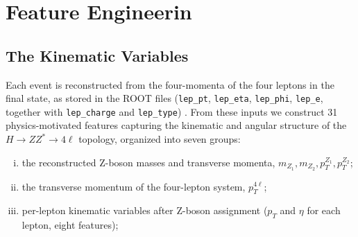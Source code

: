 \documentclass[conference]{IEEEtran}
\begin{document}
{\begin{table}[htbp]
\centering
\small
\caption{Signal and background yields}
\label{tab:yield_preselection}

\end{table}

\section{Feature Engineerin}
\subsection{The Kinematic Variables}

Each event is reconstructed from the four-momenta of the four leptons in the final state, as stored in the ROOT files (\texttt{lep\_pt}, \texttt{lep\_eta}, \texttt{lep\_phi}, \texttt{lep\_e}, together with \texttt{lep\_charge} and \texttt{lep\_type}) \cite{CMS2025Higgs4l}. From these inputs we construct 31 physics-motivated features capturing the kinematic and angular structure of the $H \rightarrow ZZ^{*} \rightarrow 4\ell$ topology, organized into seven groups:

\begin{enumerate}[(i)]
    \item the reconstructed Z-boson masses and transverse momenta,
    $m_{Z_1}, m_{Z_2}, p_{T}^{Z_1}, p_{T}^{Z_2}$;
    
    \item the transverse momentum of the four-lepton system,
    $p_{T}^{4\ell}$;
    
    \item per-lepton kinematic variables after Z-boson assignment ($p_T$ and $\eta$ for each lepton, eight features);
    

\end{enumerate}}
\end{document}
